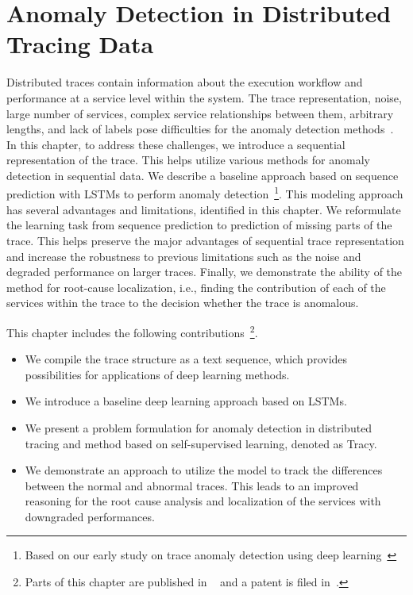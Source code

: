 
\chapter{Anomaly Detection in Distributed Tracing Data} %
\label{ch:traces} %
\minitoc
\bigskip

Distributed traces contain information about the execution workflow and performance at a service level within the system. The trace representation, noise, large number of services, complex service relationships between them, arbitrary lengths, and lack of labels pose difficulties for the anomaly detection methods~\cite{liu2020unsupervised}. In this chapter, to address these challenges, we introduce a sequential representation of the trace. This helps utilize various methods for anomaly detection in sequential data. We describe a baseline approach based on sequence prediction with LSTMs to perform anomaly detection~\footnote{Based on our early study on trace anomaly detection using deep learning~\cite{nedelkoski2019anomalymultimodal}}. This modeling approach has several advantages and limitations, identified in this chapter. We reformulate the learning task from sequence prediction to prediction of missing parts of the trace. This helps preserve the major advantages of sequential trace representation and increase the robustness to previous limitations such as the noise and degraded performance on larger traces. Finally, we demonstrate the ability of the method for root-cause localization, i.e., finding the contribution of each of the services within the trace to the decision whether the trace is anomalous.

This chapter includes the following contributions~\footnote{Parts of this chapter are published in ~\cite{nedelkoski2019anomalymultimodal,nedelkoski2020data,nedelkoski2019anomaly,nedelkoski2020selftracing} and a patent is filed in~\cite{nedelkoski2020patentjasmin}.}.
\begin{itemize}
    \item We compile the trace structure as a text sequence, which provides possibilities for applications of deep learning methods.
    \item We introduce a baseline deep learning approach based on LSTMs.
    \item We present a problem formulation for anomaly detection in distributed tracing and method based on self-supervised learning, denoted as Tracy.
    \item We demonstrate an approach to utilize the model to track the differences between the normal and abnormal traces. This leads to an improved reasoning for the root cause analysis and localization of the services with downgraded performances.
\end{itemize}

